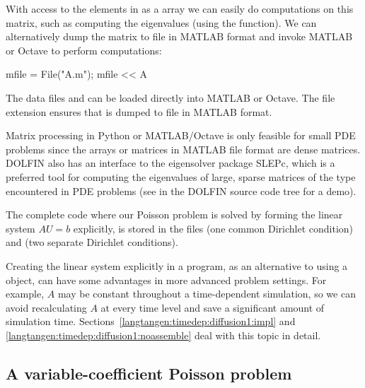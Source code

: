 With access to the elements in  as a  array we can easily
do computations on this matrix, such as computing the eigenvalues
(using the  function). We can alternatively dump
the matrix to file in MATLAB format and invoke MATLAB or Octave to
perform computations:
\begin{python}
mfile = File("A.m"); mfile << A
\end{python}
The data files  and  can be loaded directly into MATLAB
or Octave. The file extension  ensures that 
is dumped to file in MATLAB format.

Matrix processing in Python or MATLAB/Octave is only feasible for
small PDE problems since the  arrays or matrices in MATLAB
file format are dense matrices. DOLFIN also has an interface to the
eigensolver package SLEPc, which is a preferred tool for computing the
eigenvalues of large, sparse matrices of the type encountered in PDE
problems (see  in the DOLFIN source code tree for
a demo).


The complete code where our Poisson problem is solved by forming
the linear system $AU=b$ explicitly, is stored in the files
 (one common Dirichlet condition) and
 (two separate Dirichlet conditions).

Creating the linear system explicitly in a program, as an
alternative to using a  object, can have some
advantages in more advanced problem settings. For example, $A$ may
be constant throughout a time-dependent simulation, so we can avoid
recalculating $A$ at every time level and save a significant amount
of simulation time.  Sections~\ref{langtangen:timedep:diffusion1:impl}
and \ref{langtangen:timedep:diffusion1:noassemble} deal with this topic
in detail.


\subsection{A variable-coefficient Poisson problem}
\label{langtangen:possion:2D:varcoeff}

